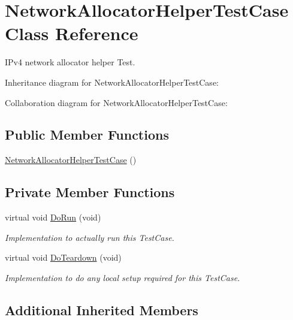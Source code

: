 \hypertarget{classNetworkAllocatorHelperTestCase}{}\section{Network\+Allocator\+Helper\+Test\+Case Class Reference}
\label{classNetworkAllocatorHelperTestCase}


I\+Pv4 network allocator helper Test.  




Inheritance diagram for Network\+Allocator\+Helper\+Test\+Case\+:


Collaboration diagram for Network\+Allocator\+Helper\+Test\+Case\+:
\subsection*{Public Member Functions}
\begin{DoxyCompactItemize}
\item 
\hyperlink{classNetworkAllocatorHelperTestCase_a676b0c757afc3da97dd15445e101f331}{Network\+Allocator\+Helper\+Test\+Case} ()
\end{DoxyCompactItemize}
\subsection*{Private Member Functions}
\begin{DoxyCompactItemize}
\item 
virtual void \hyperlink{classNetworkAllocatorHelperTestCase_aff2b2d09205c1c58d06eb09a91688fb5}{Do\+Run} (void)
\begin{DoxyCompactList}\small\item\em Implementation to actually run this Test\+Case. \end{DoxyCompactList}\item 
virtual void \hyperlink{classNetworkAllocatorHelperTestCase_ab22bf9f68723e01700d0ead52e40ca2e}{Do\+Teardown} (void)
\begin{DoxyCompactList}\small\item\em Implementation to do any local setup required for this Test\+Case. \end{DoxyCompactList}\end{DoxyCompactItemize}
\subsection*{Additional Inherited Members}


